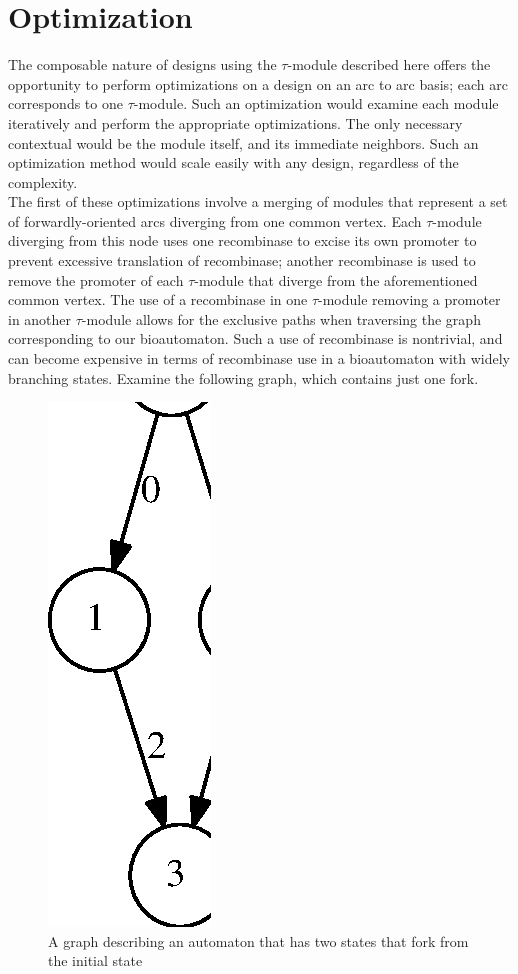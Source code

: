 \documentclass{article}
\begin{document}
\section{Optimization}
The composable nature of designs using the $\tau$-module described here offers the opportunity to perform optimizations on a design on an arc to arc basis; each arc corresponds to one $\tau$-module.  Such an optimization would examine each module iteratively and perform the appropriate optimizations.  The only necessary contextual would be the module itself, and its immediate neighbors.  Such an optimization method would scale easily with any design, regardless of the complexity.\\

The first of these optimizations involve a merging of modules that represent a set of forwardly-oriented arcs diverging from one common vertex.  Each $\tau$-module diverging from this node uses one recombinase to excise its own promoter to prevent excessive translation of recombinase; another recombinase is used to remove the promoter of each $\tau$-module that diverge from the aforementioned common vertex.  The use of a recombinase in one $\tau$-module removing a promoter in another $\tau$-module allows for the exclusive paths when traversing the graph corresponding to our bioautomaton.  Such a use of recombinase is nontrivial, and can become expensive in terms of recombinase use in a bioautomaton with widely branching states. Examine the following graph, which contains just one fork.
\\
\begin{figure} [h!]
\centering
\includegraphics{tree.eps}
\caption{A graph describing an automaton that has two states that fork from the initial state}
\end{figure}
\end{document}
